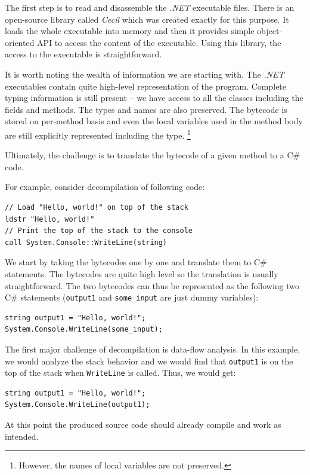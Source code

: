 \documentclass[12pt,twoside,notitlepage]{report}
\begin{document}
The first step is to read and disassemble the \emph{.NET} executable files.
There is an open-source library called \emph{Cecil} which was created exactly
for this purpose.   It loads the whole executable into memory and then
it provides simple object-oriented API to access the content of the executable.
Using this library, the access to the executable is straightforward.

It is worth noting the wealth of information we are starting with.
The \emph{.NET} executables contain quite high-level representation
of the program.  Complete typing information is still present -- 
we have access to all the classes including the fields and methods.
The types and names are also preserved.
The bytecode is stored on per-method basis and even the local variables
used in the method body are still explicitly represented including the type.%
\footnote{However, the names of local variables are not preserved.}

Ultimately, the challenge is to translate the bytecode of a given
method to a C\# code.

For example, consider decompilation of following code:

\begin{verbatim}
// Load "Hello, world!" on top of the stack
ldstr "Hello, world!"
// Print the top of the stack to the console
call System.Console::WriteLine(string)
\end{verbatim}

We start by taking the bytecodes one by one and translate them
to C\# statements.  The bytecodes are quite high level so
the translation is usually straightforward.
The two bytecodes can thus be represented as the following 
two C\# statements (\verb|output1| and \verb|some_input| are just
dummy variables):

\begin{verbatim}
string output1 = "Hello, world!";
System.Console.WriteLine(some_input);
\end{verbatim}

The first major challenge of decompilation is data-flow
analysis.  In this example, we would analyze the stack
behavior and we would find that \verb|output1| is on the top
of the stack when \verb|WriteLine| is called.  Thus, we would get:

\begin{verbatim}
string output1 = "Hello, world!";
System.Console.WriteLine(output1);
\end{verbatim}

At this point the produced source code should already compile 
and work as intended.
\end{document}

